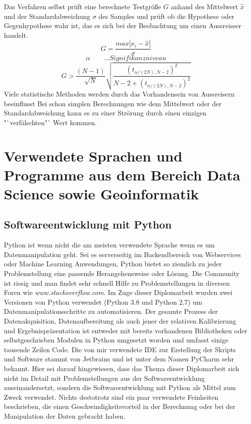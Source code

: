\documentclass[11pt]{report}
\begin{document}
Das Verfahren selbst prüft eine berechnete Testgröße $G$ anhand des Mittelwert $\hat{x}$ und der Standardabweichung $\sigma$ des Samples und prüft ob die Hypothese oder Gegenhypothese wahr ist, das es sich bei der Beobachtung um einen Aussreisser handelt. \newline
\begin{equation}
G=\frac{max\left|x_i - \hat{x}\right|}{\sigma}
\end{equation}\newline
\begin{equation}
\alpha \qquad \dots Signifikanzniveau
\end{equation}\newline
\begin{equation}
G> \frac{(N-1)}{\sqrt{N}}\sqrt{\frac{(t_{\alpha / (2N),N-2})^2}{N-2+(t_{\alpha / (2N),N-2})^2}}
\end{equation}\newline
Viele statistische Methoden werden durch das Vorhandensein von Aussreisern beeinflusst  Bei schon simplen Berechnungen wie dem Mittelwert oder der Standardabweichung kann es zu einer Strörung durch einen einzigen "`verfälschten"` Wert kommen.

\section{Verwendete Sprachen und Programme aus dem Bereich Data Science sowie Geoinformatik}
\subsection{Softwareentwicklung mit Python}

Python ist wenn nicht die am meisten verwendete Sprache wenn es um Datenmanipulation geht. Sei es serverseitig im Backendbereich von Webservices oder Machine Learning Anwendungen, Python bietet so ziemlich zu jeder Problemstellung eine passende Herangehensweise oder Lösung. Die Community ist riesig und man findet sehr schnell Hilfe zu Problemstellungen in diversen Foren wie \emph{www.stackoverflow.com}. Im Zuge dieser Diplomarbeit wurden zwei Versionen von Python verwendet (Python 3.8 und Python 2.7) um Datenmanipulationsschritte zu automatisieren. Der gesamte Prozess der Datenakquisition, Datenaufbereitung als auch jener der relativen Kalibrierung und Ergebnispräsentation ist entweder mit bereits vorhandenen Bibliotheken oder selbstgeschrieben Modulen in Python umgesetzt worden und umfasst einige tausende Zeilen Code. Die von mir verwendete IDE zur Erstellung der Skripts und Software stammt von Jetbrains und ist unter dem Namen PyCharm sehr bekannt. Hier sei darauf hingewiesen, dass das Thema dieser Diplomarbeit sich nicht im Detail mit Problemstellungen aus der Softwareentwicklung auseinandersetzt, sondern die Softwareentwicklung mit Python als Mittel zum Zweck verwendet. Nichts destotrotz sind ein paar verwendete Feinheiten beschrieben, die einen Geschwindigkeitsvorteil in der Berechnung oder bei der Manipulation der Daten gebracht haben. 
\end{document}
